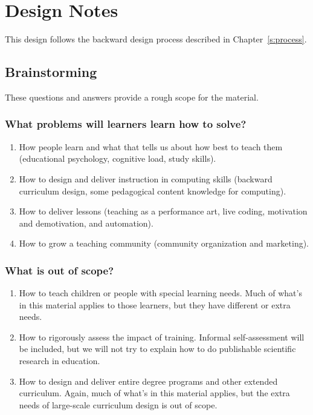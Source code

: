\chapter{Design Notes}\label{s:v3}

This design follows the backward design process described in
Chapter~\ref{s:process}.

\section{Brainstorming}\label{brainstorming}

These questions and answers provide a rough scope for the material.

\subsection*{What problems will learners learn how to solve?}

  \begin{enumerate}
  \item
    How people learn and what that tells us about how best to teach
    them (educational psychology, cognitive load, study skills).
  \item
    How to design and deliver instruction in computing skills
    (backward curriculum design, some pedagogical content knowledge
    for computing).
  \item
    How to deliver lessons (teaching as a performance art, live
    coding, motivation and demotivation, and automation).
  \item
    How to grow a teaching community (community organization and
    marketing).
  \end{enumerate}

\subsection*{What is out of scope?}

  \begin{enumerate}
  \item
    How to teach children or people with special learning needs.
    Much of what's in this material applies to those learners, but
    they have different or extra needs.
  \item
    How to rigorously assess the impact of training. Informal
    self-assessment will be included, but we will not try to explain
    how to do publishable scientific research in education.
  \item
    How to design and deliver entire degree programs and other
    extended curriculum. Again, much of what's in this material
    applies, but the extra needs of large-scale curriculum design is
    out of scope.
  \end{enumerate}

